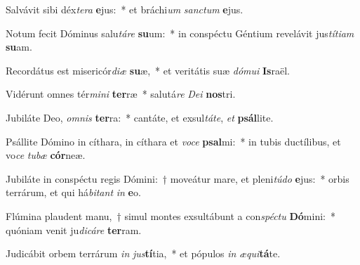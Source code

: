 \item Salvávit sibi déx\textit{te}\textit{ra} \textbf{e}jus:~* et bráchi\textit{um} \textit{sanc}\textit{tum} \textbf{e}jus.
\item Notum fecit Dóminus salu\textit{tá}\textit{re} \textbf{su}um:~* in conspéctu Géntium revelávit jus\textit{tí}\textit{ti}\textit{am} \textbf{su}am.
\item Recordátus est misericór\textit{di}\textit{æ} \textbf{su}æ,~* et veritátis suæ \textit{dó}\textit{mu}\textit{i} \textbf{Is}raël.
\item Vidérunt omnes tér\textit{mi}\textit{ni} \textbf{ter}ræ~* salutá\textit{re} \textit{De}\textit{i} \textbf{nos}tri.
\item Jubiláte Deo, \textit{om}\textit{nis} \textbf{ter}ra:~* cantáte, et exsul\textit{tá}\textit{te}, \textit{et} \textbf{psál}lite.
\item Psállite Dómino in cíthara, in cíthara et \textit{vo}\textit{ce} \textbf{psal}mi:~* in tubis ductílibus, et vo\textit{ce} \textit{tu}\textit{bæ} \textbf{cór}neæ.
\item Jubiláte in conspéctu regis Dómini:~† moveátur mare, et pleni\textit{tú}\textit{do} \textbf{e}jus:~* orbis terrárum, et qui há\textit{bi}\textit{tant} \textit{in} \textbf{e}o.
\item Flúmina plaudent manu,~† simul montes exsultábunt a con\textit{spéc}\textit{tu} \textbf{Dó}mini:~* quóniam venit ju\textit{di}\textit{cá}\textit{re} \textbf{ter}ram.
\item Judicábit orbem terrárum \textit{in} \textit{jus}\textbf{tí}tia,~* et pópulos \textit{in} \textit{æ}\textit{qui}\textbf{tá}te.
